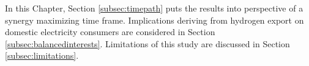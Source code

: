 
In this Chapter, Section \ref{subsec:timepath} puts the results into perspective of a synergy maximizing time frame. Implications deriving from hydrogen export on domestic electricity consumers are considered in Section \ref{subsec:balancedinterests}.
Limitations of this study are discussed in Section \ref{subsec:limitations}.







